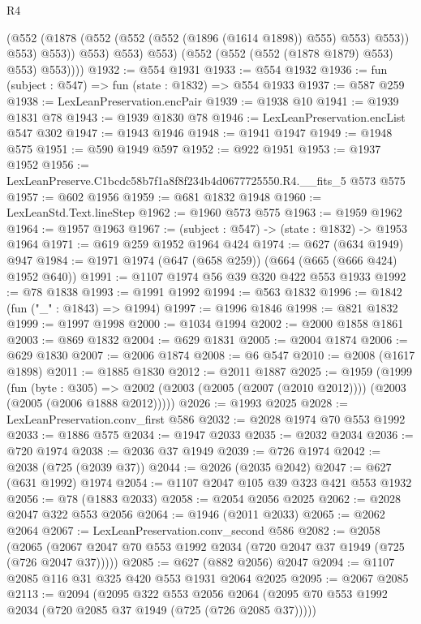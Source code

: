 \begin{lexlean}{R4}
\begin{coremodule}
                    (@552 (@1878 (@552 (@552 (@552 (@1896 (@1614 @1898)) @555) @553) @553)) @553)
                    @553))
                @553)
              @553)
            @553)
          (@552 (@552 (@552 (@1878 @1879) @553) @553) @553))))
@1932 := @554 @1931
@1933 := @554 @1932
@1936 := fun (subject : @547) => fun (state : @1832) => @554 @1933
@1937 := @587 @259
@1938 := LexLeanPreservation.encPair
@1939 := @1938 @10
@1941 := @1939 @1831 @78
@1943 := @1939 @1830 @78
@1946 := LexLeanPreservation.encList @547 @302
@1947 := @1943 @1946
@1948 := @1941 @1947
@1949 := @1948 @575
@1951 := @590 @1949 @597
@1952 := @922 @1951
@1953 := @1937 @1952
@1956 := LexLeanPreserve.C1bcdc58b7f1a8f8f234b4d0677725550.R4.__fits_5 @573 @575
@1957 := @602 @1956
@1959 := @681 @1832 @1948
@1960 := LexLeanStd.Text.lineStep
@1962 := @1960 @573 @575
@1963 := @1959 @1962
@1964 := @1957 @1963
@1967 := (subject : @547) -> (state : @1832) -> @1953 @1964
@1971 := @619 @259 @1952 @1964 @424
@1974 := @627 (@634 @1949) @947
@1984 := @1971 @1974 (@647 (@658 @259)) (@664 (@665 (@666 @424) @1952 @640))
@1991 := @1107 @1974 @56 @39 @320 @422 @553 @1933
@1992 := @78 @1838
@1993 := @1991 @1992
@1994 := @563 @1832
@1996 := @1842 (fun ("_" : @1843) => @1994)
@1997 := @1996 @1846
@1998 := @821 @1832
@1999 := @1997 @1998
@2000 := @1034 @1994
@2002 := @2000 @1858 @1861
@2003 := @869 @1832
@2004 := @629 @1831
@2005 := @2004 @1874
@2006 := @629 @1830
@2007 := @2006 @1874
@2008 := @6 @547
@2010 := @2008 (@1617 @1898)
@2011 := @1885 @1830
@2012 := @2011 @1887
@2025 := @1959
    (@1999
      (fun (byte : @305) =>
      @2002 (@2003 (@2005 (@2007 (@2010 @2012)))) (@2003 (@2005 (@2006 @1888 @2012)))))
@2026 := @1993 @2025
@2028 := LexLeanPreservation.conv_first @586
@2032 := @2028 @1974 @70 @553 @1992
@2033 := @1886 @575
@2034 := @1947 @2033
@2035 := @2032 @2034
@2036 := @720 @1974
@2038 := @2036 @37 @1949
@2039 := @726 @1974
@2042 := @2038 (@725 (@2039 @37))
@2044 := @2026 (@2035 @2042)
@2047 := @627 (@631 @1992) @1974
@2054 := @1107 @2047 @105 @39 @323 @421 @553 @1932
@2056 := @78 (@1883 @2033)
@2058 := @2054 @2056 @2025
@2062 := @2028 @2047 @322 @553 @2056
@2064 := @1946 (@2011 @2033)
@2065 := @2062 @2064
@2067 := LexLeanPreservation.conv_second @586
@2082 := @2058
    (@2065 (@2067 @2047 @70 @553 @1992 @2034 (@720 @2047 @37 @1949 (@725 (@726 @2047 @37)))))
@2085 := @627 (@882 @2056) @2047
@2094 := @1107 @2085 @116 @31 @325 @420 @553 @1931 @2064 @2025
@2095 := @2067 @2085
@2113 := @2094
    (@2095
      @322
      @553
      @2056
      @2064
      (@2095 @70 @553 @1992 @2034 (@720 @2085 @37 @1949 (@725 (@726 @2085 @37)))))

\end{coremodule}
\end{lexlean}
